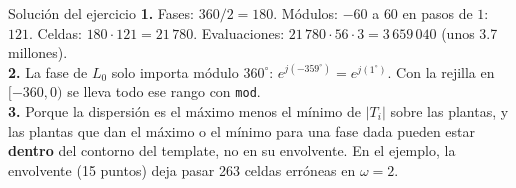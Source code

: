 \documentclass[aspectratio=169,11pt]{beamer}
\begin{document}
\appendix
\begin{frame}{Solución del ejercicio}
  \footnotesize
  \textbf{1.} Fases: $360/2=180$. Módulos: $-60$ a $60$ en pasos de $1$: $121$. Celdas: $180\cdot121=21\,780$. Evaluaciones: $21\,780\cdot56\cdot3=3\,659\,040$ (unos 3.7 millones).\\[3pt]
  \textbf{2.} La fase de $L_0$ solo importa módulo $360^\circ$: $e^{j(-359^\circ)}=e^{j(1^\circ)}$. Con la rejilla en $[-360,0)$ se lleva todo ese rango con \texttt{mod}.\\[3pt]
  \textbf{3.} Porque la dispersión es el máximo menos el mínimo de $|T_i|$ sobre las plantas, y las plantas que dan el máximo o el mínimo para una fase dada pueden estar \textbf{dentro} del contorno del template, no en su envolvente. En el ejemplo, la envolvente (15 puntos) deja pasar 263 celdas erróneas en $\omega=2$.
\end{frame}
\end{document}
